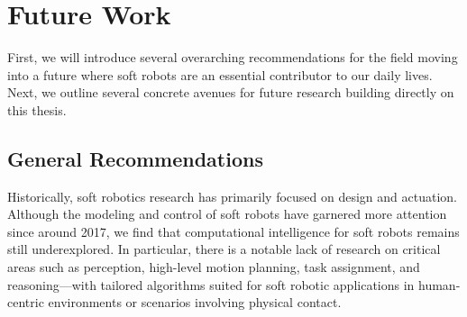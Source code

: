 \section{Future Work}\label{sec:conclusion:future_work}
First, we will introduce several overarching recommendations for the field moving into a future where soft robots are an essential contributor to our daily lives.
Next, we outline several concrete avenues for future research building directly on this thesis.

\subsection{General Recommendations}

Historically, soft robotics research has primarily focused on design and actuation. Although the modeling and control of soft robots have garnered more attention since around 2017, we find that computational intelligence for soft robots remains still underexplored. In particular, there is a notable lack of research on critical areas such as perception, high-level motion planning, task assignment, and reasoning—with tailored algorithms suited for soft robotic applications in human-centric environments or scenarios involving physical contact.


